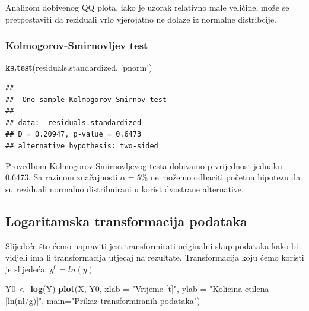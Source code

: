 \documentclass[]{article}
\newenvironment{Shaded}{\begin{snugshade}}{\end{snugshade}}
\newcommand{\KeywordTok}[1]{\textcolor[rgb]{0.13,0.29,0.53}{\textbf{{#1}}}}
\newcommand{\DataTypeTok}[1]{\textcolor[rgb]{0.13,0.29,0.53}{{#1}}}
\newcommand{\StringTok}[1]{\textcolor[rgb]{0.31,0.60,0.02}{{#1}}}
\newcommand{\NormalTok}[1]{{#1}}
\begin{document}
Analizom dobivenog QQ plota, iako je uzorak relativno male veličine,
može se pretpostaviti da reziduali vrlo vjerojatno ne dolaze iz normalne
distribcije.

\subsubsection{Kolmogorov-Smirnovljev
test}\label{kolmogorov-smirnovljev-test}

\begin{Shaded}
\begin{Highlighting}[]
\KeywordTok{ks.test}\NormalTok{(residuals.standardized, }\StringTok{'pnorm'}\NormalTok{)}
\end{Highlighting}
\end{Shaded}

\begin{verbatim}
## 
##  One-sample Kolmogorov-Smirnov test
## 
## data:  residuals.standardized
## D = 0.20947, p-value = 0.6473
## alternative hypothesis: two-sided
\end{verbatim}

Provedbom Kolmogorov-Smirnovljevog testa dobivamo p-vrijednost jednaku
0.6473. Sa razinom značajnosti \(\alpha=5\%\) ne možemo odbaciti početnu
hipotezu da su reziduali normalno distribuirani u korist dvostrane
alternative.

\subsection{Logaritamska transformacija
podataka}\label{logaritamska-transformacija-podataka}

Slijedeće što ćemo napraviti jest transformirati originalni skup
podataka kako bi vidjeli ima li transformacija utjecaj na rezultate.
Transformacija koju ćemo koristi je slijedeća: \(y^0 = ln(y)\) .

\begin{Shaded}
\begin{Highlighting}[]
\NormalTok{Y0 <-}\StringTok{ }\KeywordTok{log}\NormalTok{(Y)}
\KeywordTok{plot}\NormalTok{(X, Y0, }\DataTypeTok{xlab =} \StringTok{"Vrijeme [t]"}\NormalTok{, }\DataTypeTok{ylab =} \StringTok{"Kolicina etilena [ln(nl/g)]"}\NormalTok{,}
     \DataTypeTok{main=}\StringTok{"Prikaz transformiranih podataka"}\NormalTok{)}
\end{Highlighting}
\end{Shaded}
\end{document}
